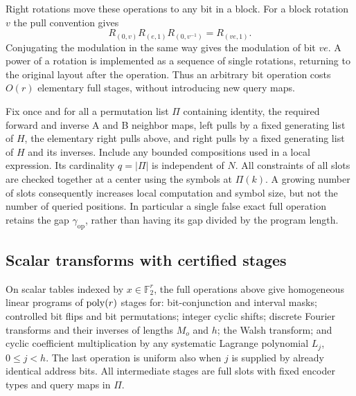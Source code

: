 Right rotations move these operations to any bit in a block.  For a
block rotation $v$ the pull convention gives
\[
 R_{(0,v)}R_{(e,1)}R_{(0,v^{-1})}=R_{(ve,1)}.
\]
Conjugating the modulation in the same way gives the modulation of bit
$ve$.  A power of a rotation is implemented as a sequence of single
rotations, returning to the original layout after the operation.
Thus an arbitrary bit operation costs $O(r)$ elementary full stages,
without introducing new query maps.

Fix once and for all a permutation list $\Pi$ containing identity,
the required forward and inverse A and B neighbor maps, left pulls by
a fixed generating list of $H$, the elementary right pulls above,
and right pulls by a fixed generating list of $H$ and its inverses.
Include any bounded compositions used in a local expression.
Its cardinality $q=|\Pi|$ is independent of $N$.
All constraints of all slots are checked together at a center using
the symbols at $\Pi(k)$.  A growing number of slots consequently
increases local computation and symbol size, but not the number of
queried positions.  In particular a single false exact full operation
retains the gap $\gamma_{\mathrm{op}}$, rather than having its gap
divided by the program length.

\subsection{Scalar transforms with certified stages}

\begin{lemma}\label{op:scalar-programs}
On scalar tables indexed by $x\in\mathbb F_2^r$, the full operations
above give homogeneous linear programs of $\operatorname{poly}(r)$ stages for:
bit-conjunction and interval masks; controlled bit flips and bit
permutations; integer cyclic shifts; discrete Fourier transforms and
their inverses of lengths $M_o$ and $h$; the Walsh transform; and cyclic
coefficient multiplication by any systematic Lagrange polynomial
$L_j$, $0\le j<h$.  The last operation is uniform also when $j$ is
supplied by already identical address bits.  All intermediate stages
are full slots with fixed encoder types and query maps in $\Pi$.
\end{lemma}

